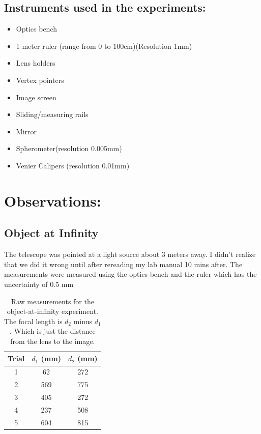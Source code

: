 \documentclass{article}
\begin{document}
\subsection{Instruments used in the experiments:}
\begin{itemize}
    \item Optics bench
    \item 1 meter ruler (range from 0 to 100cm)(Resolution 1mm)
    \item Lens holders
    \item Vertex pointers
    \item Image screen
    \item Sliding/measuring rails
    \item Mirror
    \item Spherometer(resolution 0.005mm)
    \item Venier Calipers (resolution 0.01mm)

\end{itemize}

\section{Observations:}

\subsection{Object at Infinity}
The telescope was pointed at a light source about 3 meters away. I didn’t realize that we did it wrong until after rereading my lab manual 10 mins after.
The measurements were measured using the optics bench and the ruler which has the uncertainty of 0.5 mm
\begin{table}[H]
    \centering
    \begin{tabular}{ccc}
        \hline
        Trial & $d_1$ (mm) & $d_2$ (mm) \\
        \hline
        1 & 62  & 272 \\
        2 & 569 & 775 \\
        3 & 405 & 272 \\
        4 & 237 & 508 \\
        5 & 604 & 815 \\
        \hline
    \end{tabular}
    \caption{Raw measurements for the object-at-infinity experiment. The focal length is $d_2$ minus $d_1$. Which is just the distance from the lens to the image.}
    \label{tab:object_infinity}
\end{table}
\end{document}
